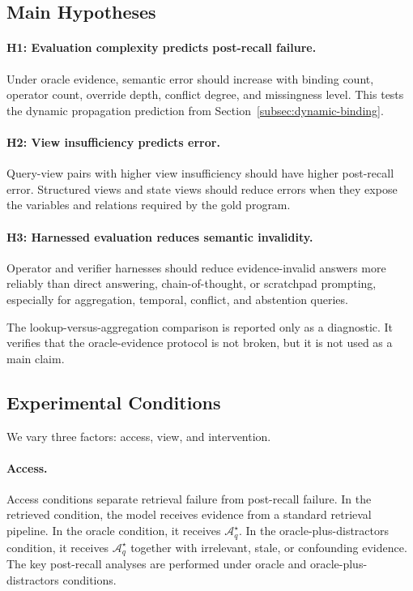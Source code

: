\subsection{Main Hypotheses}
\label{subsec:hypotheses}

\paragraph{H1: Evaluation complexity predicts post-recall failure.}
Under oracle evidence, semantic error should increase with binding count, operator count, override depth, conflict degree, and missingness level.
This tests the dynamic propagation prediction from Section~\ref{subsec:dynamic-binding}.

\paragraph{H2: View insufficiency predicts error.}
Query-view pairs with higher view insufficiency should have higher post-recall error.
Structured views and state views should reduce errors when they expose the variables and relations required by the gold program.

\paragraph{H3: Harnessed evaluation reduces semantic invalidity.}
Operator and verifier harnesses should reduce evidence-invalid answers more reliably than direct answering, chain-of-thought, or scratchpad prompting, especially for aggregation, temporal, conflict, and abstention queries.

The lookup-versus-aggregation comparison is reported only as a diagnostic.
It verifies that the oracle-evidence protocol is not broken, but it is not used as a main claim.

\subsection{Experimental Conditions}
\label{subsec:experimental-conditions}

We vary three factors: access, view, and intervention.

\paragraph{Access.}
Access conditions separate retrieval failure from post-recall failure.
In the retrieved condition, the model receives evidence from a standard retrieval pipeline.
In the oracle condition, it receives $\mathcal A_q^\star$.
In the oracle-plus-distractors condition, it receives $\mathcal A_q^\star$ together with irrelevant, stale, or confounding evidence.
The key post-recall analyses are performed under oracle and oracle-plus-distractors conditions.

